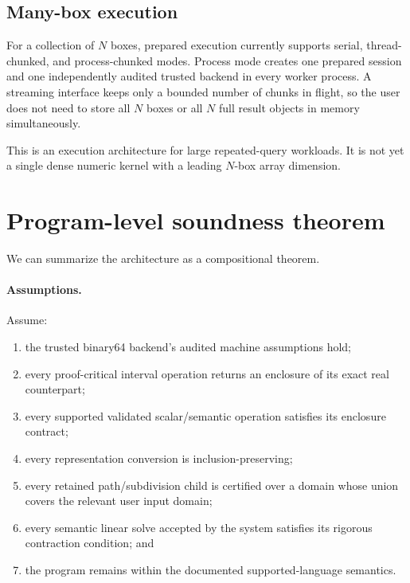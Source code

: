 \documentclass[11pt]{article}
\begin{document}
\subsection{Many-box execution}

For a collection of \(N\) boxes, prepared execution currently supports serial,
thread-chunked, and process-chunked modes.  Process mode creates one prepared
session and one independently audited trusted backend in every worker process.
A streaming interface keeps only a bounded number of chunks in flight, so the
user does not need to store all \(N\) boxes or all \(N\) full result objects in
memory simultaneously.

This is an execution architecture for large repeated-query workloads.  It is not
yet a single dense numeric kernel with a leading \(N\)-box array dimension.

\section{Program-level soundness theorem}

We can summarize the architecture as a compositional theorem.

\paragraph{Assumptions.}
Assume:
\begin{enumerate}[leftmargin=*]
\item the trusted binary64 backend's audited machine assumptions hold;
\item every proof-critical interval operation returns an enclosure of its exact
real counterpart;
\item every supported validated scalar/semantic operation satisfies its enclosure
contract;
\item every representation conversion is inclusion-preserving;
\item every retained path/subdivision child is certified over a domain whose
union covers the relevant user input domain;
\item every semantic linear solve accepted by the system satisfies its rigorous
contraction condition; and
\item the program remains within the documented supported-language semantics.
\end{enumerate}
\end{document}
